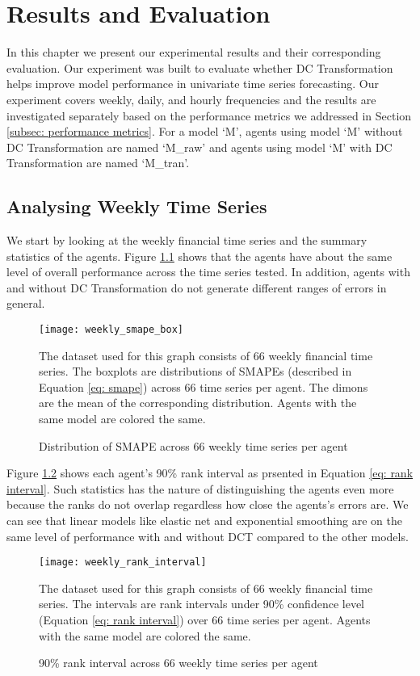 \chapter{Results and Evaluation}\label{ch: results and eval}
In this chapter we present our experimental results and their corresponding evaluation. Our experiment was built to evaluate whether DC Transformation helps improve model performance in univariate time series forecasting. Our experiment covers weekly, daily, and hourly frequencies and the results are investigated separately based on the performance metrics we addressed in Section \ref{subsec: performance metrics}. For a model `M', agents using model `M' without DC Transformation are named `M\_raw' and agents using model `M' with DC Transformation are named `M\_tran'.

\section{Analysing Weekly Time Series}
We start by looking at the weekly financial time series and the summary statistics of the agents. Figure \ref{fig: weekly smape box} shows that the agents have about the same level of overall performance across the time series tested. In addition, agents with and without DC Transformation do not generate different ranges of errors in general.
\begin{figure}[H]
    \centering
    \texttt{[image: weekly\_smape\_box]}
    \caption{Distribution of SMAPE across $66$ weekly time series per agent}
    {\raggedright \footnotesize The dataset used for this graph consists of $66$ weekly financial time series. The boxplots are distributions of SMAPEs (described in Equation \ref{eq: smape}) across $66$ time series per agent. The dimons are the mean of the corresponding distribution. Agents with the same model are colored the same. \par}
    \label{fig: weekly smape box}
\end{figure}
Figure \ref{fig: weekly rank interval} shows each agent's 90\% rank interval as prsented in Equation \ref{eq: rank interval}. Such statistics has the nature of distinguishing the agents even more because the ranks do not overlap regardless how close the agents's errors are. We can see that linear models like elastic net and exponential smoothing are on the same level of performance with and without DCT compared to the other models.
\begin{figure}[H]
    \centering
    \texttt{[image: weekly\_rank\_interval]}
    \caption{90\% rank interval across $66$ weekly time series per agent}
    {\raggedright \footnotesize The dataset used for this graph consists of $66$ weekly financial time series. The intervals are rank intervals under 90\% confidence level (Equation \ref{eq: rank interval}) over $66$ time series per agent. Agents with the same model are colored the same. \par}
    \label{fig: weekly rank interval}
\end{figure}
